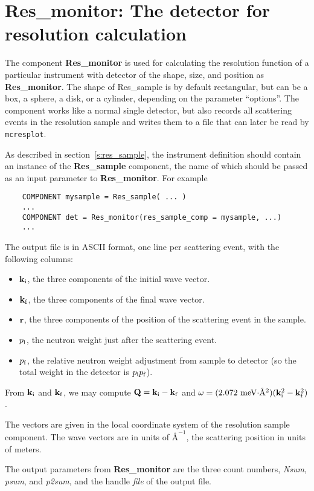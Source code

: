 
\section{Res\_monitor: The detector for resolution calculation}
\label{s:res_monitor}


The component {\bf Res\_monitor} is used for calculating the
resolution function of a particular instrument with detector of the
shape, size, and position as {\bf Res\_monitor}.
The shape of {\rm Res\_sample} is by default rectangular,
but can be a box, a sphere, a disk, or a cylinder,
depending on the parameter ``options''.
The component works like a normal single detector, but
also records all scattering events in the resolution sample and writes
them to a file that can later be read by \verb+mcresplot+.

As described in section~\ref{s:res_sample},
the instrument definition should contain an instance of the
\textbf{Res\_sample} component, the name of which should be passed as an
input parameter to \textbf{Res\_monitor}. For example
\begin{verbatim}
    COMPONENT mysample = Res_sample( ... )
    ...
    COMPONENT det = Res_monitor(res_sample_comp = mysample, ...)
    ...
\end{verbatim}

The output file is in ASCII format, one line per scattering event, with
the following columns:
\begin{itemize}
\item ${\bf k}_{\rm i}$, the three components of the initial wave vector.
\item ${\bf k}_{\rm f}$, the three components of the final wave vector.
\item ${\bf r}$, the three components of the position of the scattering
  event in the sample.
\item $p_{\rm i}$, the neutron weight just after the scattering event.
\item $p_{\rm f}$, the relative neutron weight adjustment from sample to
  detector (so the total weight in the detector is $p_{\rm i}p_{\rm f}$).
\end{itemize}
From ${\bf k}_{\rm i}$ and ${\bf k}_{\rm f}$, we may compute ${\bf Q} =
{\bf k}_{\rm i} - {\bf k}_{\rm f}$ and $\omega = (\mbox{2.072
  meV$\cdot$\AA$^2$})({\bf k}_{\rm i}^2 - {\bf k}_{\rm f}^2)$.

The vectors are given in the local coordinate system of the resolution
sample component. The wave vectors are in units of $\mbox{\AA}^{-1}$, the
scattering position in units of meters.

 The output parameters from {\bf Res\_monitor}
are the three count numbers, \textit{Nsum}, \textit{psum},
and \textit{p2sum}, and the handle \textit{file} of the output file.

